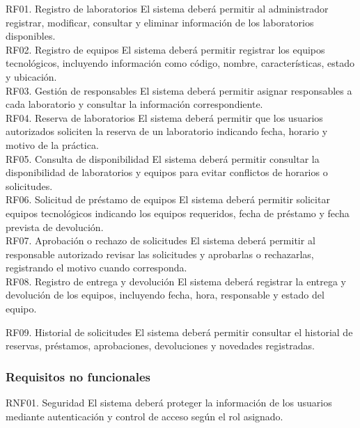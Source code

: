 \documentclass[pdflatex,sn-mathphys-num]{sn-jnl}%
\theoremstyle{thmstyleone}%
\theoremstyle{thmstyletwo}%
\theoremstyle{thmstylethree}%
\begin{document}
 		
 		RF01. Registro de laboratorios 
 		El sistema deberá permitir al administrador registrar, modificar, consultar y eliminar información de los laboratorios disponibles. \\ 
 		
 		RF02. Registro de equipos 
 		El sistema deberá permitir registrar los equipos tecnológicos, incluyendo información como código, nombre, características, estado y ubicación. \\ 
 		
 		RF03. Gestión de responsables 
 		El sistema deberá permitir asignar responsables a cada laboratorio y consultar la información correspondiente. \\ 
 		
 		RF04. Reserva de laboratorios 
 		El sistema deberá permitir que los usuarios autorizados soliciten la reserva de un laboratorio indicando fecha, horario y motivo de la práctica. \\ 
 		
 		RF05. Consulta de disponibilidad 
 		El sistema deberá permitir consultar la disponibilidad de laboratorios y equipos para evitar conflictos de horarios o solicitudes. \\ 
 		
 		RF06. Solicitud de préstamo de equipos 
 		El sistema deberá permitir solicitar equipos tecnológicos indicando los equipos requeridos, fecha de préstamo y fecha prevista de devolución. \\ 
 		
 		RF07. Aprobación o rechazo de solicitudes 
 		El sistema deberá permitir al responsable autorizado revisar las solicitudes y aprobarlas o rechazarlas, registrando el motivo cuando corresponda. \\ 
 		
 		RF08. Registro de entrega y devolución 
 		El sistema deberá registrar la entrega y devolución de los equipos, incluyendo fecha, hora, responsable y estado del equipo. 
 		
 		RF09. Historial de solicitudes 
 		El sistema deberá permitir consultar el historial de reservas, préstamos, aprobaciones, devoluciones y novedades registradas. 
 
 
 \subsubsection*{Requisitos no funcionales}
 
 		
 		RNF01. Seguridad 
 		El sistema deberá proteger la información de los usuarios mediante autenticación y control de acceso según el rol asignado. 
 		
\end{document}
